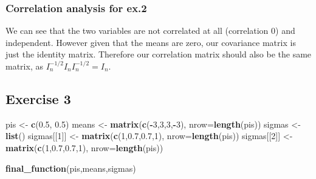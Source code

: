 \documentclass[]{article}
\newenvironment{Shaded}{\begin{snugshade}}{\end{snugshade}}
\newcommand{\DataTypeTok}[1]{\textcolor[rgb]{0.13,0.29,0.53}{#1}}
\newcommand{\DecValTok}[1]{\textcolor[rgb]{0.00,0.00,0.81}{#1}}
\newcommand{\FloatTok}[1]{\textcolor[rgb]{0.00,0.00,0.81}{#1}}
\newcommand{\KeywordTok}[1]{\textcolor[rgb]{0.13,0.29,0.53}{\textbf{#1}}}
\newcommand{\NormalTok}[1]{#1}
\newcommand{\OperatorTok}[1]{\textcolor[rgb]{0.81,0.36,0.00}{\textbf{#1}}}
\newcommand{\StringTok}[1]{\textcolor[rgb]{0.31,0.60,0.02}{#1}}
\begin{document}
\hypertarget{correlation-analysis-for-ex.2}{%
\subsubsection{Correlation analysis for
ex.2}\label{correlation-analysis-for-ex.2}}

We can see that the two variables are not correlated at all (correlation
0) and independent. However given that the means are zero, our
covariance matrix is just the identity matrix. Therefore our correlation
matrix should also be the same matrix, as
\(I_{n}^{-1/2} I_{n} I_{n}^{-1/2} = I_{n}\).

\newpage

\hypertarget{exercise-3}{%
\subsection{Exercise 3}\label{exercise-3}}

\begin{Shaded}
\begin{Highlighting}[]
\NormalTok{pis <-}\StringTok{ }\KeywordTok{c}\NormalTok{(}\FloatTok{0.5}\NormalTok{, }\FloatTok{0.5}\NormalTok{)}
\NormalTok{means <-}\StringTok{ }\KeywordTok{matrix}\NormalTok{(}\KeywordTok{c}\NormalTok{(}\OperatorTok{-}\DecValTok{3}\NormalTok{,}\DecValTok{3}\NormalTok{,}\DecValTok{3}\NormalTok{,}\OperatorTok{-}\DecValTok{3}\NormalTok{), }\DataTypeTok{nrow=}\KeywordTok{length}\NormalTok{(pis))}
\NormalTok{sigmas <-}\StringTok{ }\KeywordTok{list}\NormalTok{()}
\NormalTok{sigmas[[}\DecValTok{1}\NormalTok{]] <-}\StringTok{ }\KeywordTok{matrix}\NormalTok{(}\KeywordTok{c}\NormalTok{(}\DecValTok{1}\NormalTok{,}\FloatTok{0.7}\NormalTok{,}\FloatTok{0.7}\NormalTok{,}\DecValTok{1}\NormalTok{), }\DataTypeTok{nrow=}\KeywordTok{length}\NormalTok{(pis))}
\NormalTok{sigmas[[}\DecValTok{2}\NormalTok{]] <-}\StringTok{ }\KeywordTok{matrix}\NormalTok{(}\KeywordTok{c}\NormalTok{(}\DecValTok{1}\NormalTok{,}\FloatTok{0.7}\NormalTok{,}\FloatTok{0.7}\NormalTok{,}\DecValTok{1}\NormalTok{), }\DataTypeTok{nrow=}\KeywordTok{length}\NormalTok{(pis))}
\end{Highlighting}
\end{Shaded}

\begin{Shaded}
\begin{Highlighting}[]
\KeywordTok{final_function}\NormalTok{(pis,means,sigmas)}
\end{Highlighting}
\end{Shaded}
\end{document}
